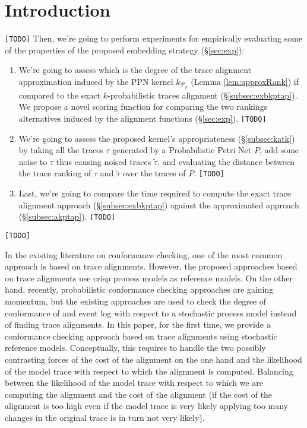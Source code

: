 \section{Introduction}\label{introduction}
\texttt{\color{red}[TODO]}
Then, we're going to perform experiments for empirically evaluating some of the properties of the proposed embedding strategy (\S\ref{sec:exp}):
\begin{enumerate}
	\item We're going to assess which is the degree of the trace alignment approximation induced by the PPN kernel $k_{\mathcal{P}_\phi}$ (Lemma \ref{lem:approxRank}) if compared to the exact $k$-probabilistic traces alignment (\S\ref{subsec:exbkptap}). We propose a novel scoring function for comparing the two rankings alternatives induced by the alignment functions (\S\ref{sec:exp}). \texttt{\color{red}[TODO]}
	\item We're going to assess the proposed kernel's appropriateness (\S\ref{subsec:katk}) by taking all the traces $\tau$ generated by a Probabilistic Petri Net $P$, add some noise to $\tau$ thus causing noised traces $\tilde{\tau}$, and evaluating the distance between the trace ranking of $\tau$ and $\tilde{\tau}$ over the traces of $P$. \texttt{\color{red}[TODO]}
	\item Last, we're going to compare the time required to compute the exact trace alignment approach (\S\ref{subsec:exbkptap}) against the approximated approach (\S\ref{subsec:akptap}). \texttt{\color{red}[TODO]}
\end{enumerate}
\texttt{\color{red}[TODO]}

In the existing literature on conformance checking, one of the most common approach is based on trace alignments. However, the proposed approaches based on trace alignments use crisp process models as reference models. On the other hand, recently, probabilistic conformance checking approaches are gaining momentum, but the existing approaches are used to check the degree of conformance of and event log with respect to a stochastic process model instead of finding trace alignments.
In this paper, for the first time, we provide a conformance checking approach based on trace alignments using stochastic reference models. Conceptually, this requires to handle the two possibly contrasting forces of the cost of the alignment on the one hand and the likelihood of the model trace with respect to which the alignment is computed.
Balancing between the likelihood of the model trace with respect to which we are computing the alignment and the cost of the alignment (if the cost of the alignment is too high even if the model trace is very likely applying too many changes in the original trace is in turn not very likely).

